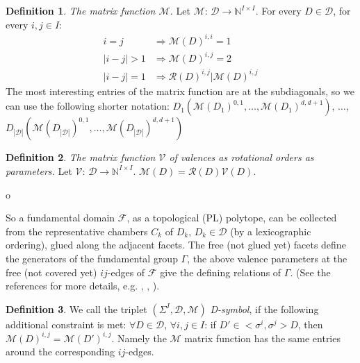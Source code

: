 \documentclass[12pt,a4paper]{article}
\theoremstyle{plain}%
\theoremstyle{definition}
\newtheorem{defn}{Definition}[section]
\theoremstyle{remark}
\begin{document}
\begin{defn}
  {\em The matrix function $\mathcal{M}$.}
  Let $\mathcal{M}$: $\mathcal{D} \rightarrow \mathbb{N}^{I\times I}$.
  For every $D\in\mathcal{D}$, for every $i,j\in I$:
  \begin{align}
    i=j & \Rightarrow \mathcal{M}(D)^{i,i}=1 \\
    |i-j|>1 & \Rightarrow \mathcal{M}(D)^{i,j}=2 \\
    |i-j|=1 & \Rightarrow \mathcal{R}(D)^{i,j}|\mathcal{M}(D)^{i,j}
  \end{align}
  The most interesting entries of the matrix function are at the subdiagonals, so
  we can use the following shorter notation:
  $D_1(\mathcal{M}(D_1)^{0,1},\ldots,\mathcal{M}(D_1)^{d,d+1})$, $\ldots$,
  $D_{|\mathcal{D}|}(\mathcal{M}(D_{|\mathcal{D}|})^{0,1},\ldots,\mathcal{M}(D_{|\mathcal{D}|})^{d,d+1})$
\end{defn}

\begin{defn}
  {\em The matrix function $\mathcal{V}$ of valences as rotational orders
  as parameters.}
  Let $\mathcal{V}$: $\mathcal{D} \rightarrow \mathbb{N}^{I\times I}$.
  $\mathcal{M}(D)=\mathcal{R}(D)\mathcal{V}(D)$.
\end{defn}o

So a fundamental domain $\mathcal{F}$, as a topological (PL) polytope, can be collected
from the representative chambers $C_k$ of $D_k$, $D_k\in\mathcal{D}$ (by a
lexicographic ordering), glued along the adjacent facets. The free (not glued
yet) facets define the generators of the fundamental group $\Gamma$, the above
valence parameters at the free (not covered yet) $ij$-edges of $\mathcal{F}$
give the defining relations of $\Gamma$. (See the references for more details,
e.g. \cite{DHM93}, \cite{M96}, \cite{M11}).

\begin{defn}
  We call the triplet $(\Sigma^I,\mathcal{D},\mathcal{M})$ {\em D-symbol}, if the
  following additional constraint is met:
  $\forall D\in \mathcal{D}$, $\forall i,j\in I$: if $D' \in
  <\sigma^i,\sigma^j>D$, then $\mathcal{M}(D)^{i,j}=\mathcal{M}(D')^{i,j}$.
  Namely the $\mathcal{M}$ matrix function has the same entries around the
  corresponding $ij$-edges.
\end{defn}

\end{document}
